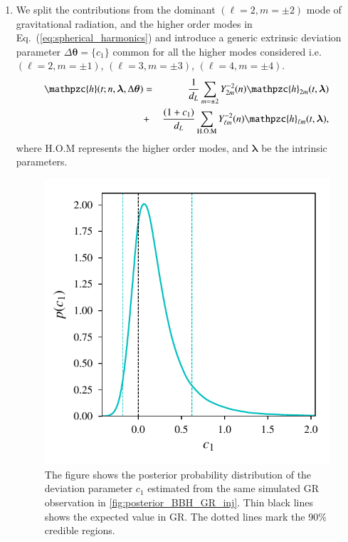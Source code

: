 \documentclass[prd,preprintnumbers,twocolumn,eqsecnum,floatfix,a4paper,nofootinbib,superscriptaddress]{revtex4}
\newcommand{\h}{\mathpzc{h}}
\newcommand{\hlm}{\mathpzc{h}_{\ell m}}
\newcommand{\Ylm}{{Y}^{-2}_{\ell m}}
\newcommand{\blambda}{\bm{\lambda}}
\newcommand{\btheta}{\bm{\theta}}
\begin{document}
 \begin{enumerate}
 	\item We split the contributions from the dominant $(\ell = 2, m = \pm 2)$ mode of gravitational radiation, and the higher order modes in Eq.~(\ref{eq:spherical_harmonics}) and introduce a generic extrinsic deviation parameter $\Delta \btheta=\{c_1\}$ common for all the higher modes considered i.e. $(\ell = 2, m=\pm1)$, $(\ell = 3, m=\pm3)$, $(\ell = 4, m = \pm4)$.
 	\begin{eqnarray}
 	{\h}(t; n, \blambda, \Delta \btheta) & = & \frac{1}{d_L} \sum_{m = \pm2} Y^{-2}_{2m} (n) {\h}_{2m}(t, \blambda)  \nonumber \\ 
 	& + & \frac{(1+{c_1})}{d_L} \sum _{\text{H.O.M}} \Ylm (n) \hlm(t, \blambda),
 	\label{eq:test_c1}
 	\end{eqnarray}
 	where  H.O.M represents the higher order modes, and $\blambda$ be the intrinsic parameters. 	
 
 \begin{figure}[tbh]
 	\begin{center}
 		\includegraphics[scale=0.63]{figs/hist_c1_M_80_q_9_snr_25.pdf}
 	\end{center} 
 	\caption{The figure shows the posterior probability distribution of the deviation parameter $c_1$ estimated from the same simulated GR observation in \ref{fig:posterior_BBH_GR_inj}. Thin black lines shows the expected value in GR. The dotted lines mark the 90\% credible regions. }
 	\label{fig:c1_hist}
 \end{figure}
 

\end{enumerate}
\end{document}

